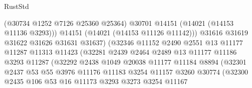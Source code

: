 \begin{lexlean}{RustStd}
\begin{coremodule}
                                      (@30734 @1252 @7126 @25360 @25364)
                                      @30701
                                      @14151
                                      (@14021 (@14153 @11136 @3293)))
                                    @14151
                                    (@14021 (@14153 @11126 @11142)))
                                  @31616
                                  @31619
                                  @31622
                                  @31626
                                  @31631
                                  @31637)
                                (@32346
                                  @11152
                                  @2490
                                  @2551
                                  @13
                                  @11177
                                  @11287
                                  @11313
                                  @11423
                                  (@32281
                                    @2439
                                    @2464
                                    @2489
                                    @13
                                    @11177
                                    @11186
                                    @3293
                                    @11287
                                    (@32292
                                      @2438
                                      @1049
                                      @20038
                                      @11177
                                      @11184
                                      @8894
                                      (@32301
                                        @2437
                                        @53
                                        @55
                                        @3976
                                        @11176
                                        @11183
                                        @3254
                                        @11157
                                        @3260
                                        @30774
                                        (@32300
                                          @2435
                                          @106
                                          @53
                                          @16
                                          @11173
                                          @3293
                                          @3273
                                          @3254
                                          @11167

\end{coremodule}
\end{lexlean}
